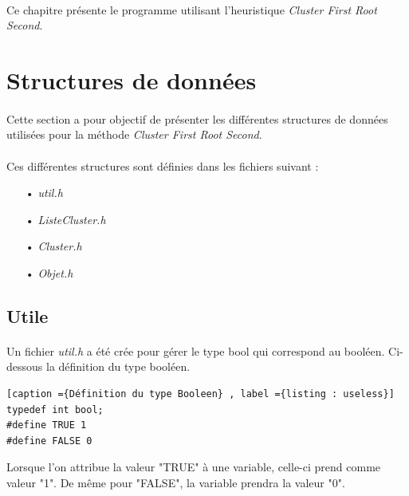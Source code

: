 \documentclass[twoside,UTF8]{EPURapport}
\begin{document}
\paragraph{} Ce chapitre présente le programme utilisant l'heuristique \textit{Cluster First Root Second}. 



\section{Structures de données}
\label{subsec:struct}

\paragraph{} Cette section a pour objectif de présenter les différentes structures de données utilisées pour la méthode \textit{Cluster First Root Second}.

\paragraph{}Ces différentes structures sont définies dans les fichiers suivant : 
\begin{itemize}
\item[•] \textit{util.h}
\item[•]\textit{ListeCluster.h}
\item[•]\textit{Cluster.h}
\item[•]\textit{Objet.h}
\end{itemize}

\subsection{Utile}
\label{subsec:util.h}

\paragraph{}
Un fichier \textit{util.h} a été crée pour gérer le type bool qui correspond au booléen. 
Ci-dessous la définition du type booléen. 
\begin{lstlisting}[caption ={Définition du type Booleen} , label ={listing : useless}]
typedef int bool;
#define TRUE 1
#define FALSE 0
\end{lstlisting}

Lorsque l'on attribue la valeur "TRUE" à une variable, celle-ci prend comme valeur "1". De m\^eme pour "FALSE", la variable prendra la valeur "0".
\end{document}
